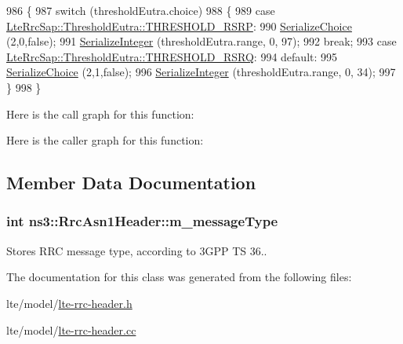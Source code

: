 \begin{DoxyCode}
986 \{
987   \textcolor{keywordflow}{switch} (thresholdEutra.choice)
988     \{
989     \textcolor{keywordflow}{case} \hyperlink{structns3_1_1LteRrcSap_1_1ThresholdEutra_ad3ed2704b836132980dd2e97cb03822ca0663d5baa9382bd755acb712f6ebf707}{LteRrcSap::ThresholdEutra::THRESHOLD\_RSRP}:
990       \hyperlink{classns3_1_1Asn1Header_a400ef4a710499da80fc55e23a973d4fa}{SerializeChoice} (2,0,\textcolor{keyword}{false});
991       \hyperlink{classns3_1_1Asn1Header_ab1c3bd37730affa7473bc759d625c29a}{SerializeInteger} (thresholdEutra.range, 0, 97);
992       \textcolor{keywordflow}{break};
993     \textcolor{keywordflow}{case} \hyperlink{structns3_1_1LteRrcSap_1_1ThresholdEutra_ad3ed2704b836132980dd2e97cb03822ca6e8bda2b99825f09f53388c29b6402b4}{LteRrcSap::ThresholdEutra::THRESHOLD\_RSRQ}:
994     \textcolor{keywordflow}{default}:
995       \hyperlink{classns3_1_1Asn1Header_a400ef4a710499da80fc55e23a973d4fa}{SerializeChoice} (2,1,\textcolor{keyword}{false});
996       \hyperlink{classns3_1_1Asn1Header_ab1c3bd37730affa7473bc759d625c29a}{SerializeInteger} (thresholdEutra.range, 0, 34);
997     \}
998 \}
\end{DoxyCode}


Here is the call graph for this function\+:




Here is the caller graph for this function\+:




\subsection{Member Data Documentation}
\subsubsection[{\texorpdfstring{m\+\_\+message\+Type}{m_messageType}}]{\setlength{\rightskip}{0pt plus 5cm}int ns3\+::\+Rrc\+Asn1\+Header\+::m\+\_\+message\+Type\hspace{0.3cm}{\ttfamily [protected]}}\hypertarget{classns3_1_1RrcAsn1Header_ac4f5302ccdfed580e79d62f6be6a4bee}{}\label{classns3_1_1RrcAsn1Header_ac4f5302ccdfed580e79d62f6be6a4bee}


Stores R\+RC message type, according to 3\+G\+PP TS 36.. 



The documentation for this class was generated from the following files\+:\begin{DoxyCompactItemize}
\item 
lte/model/\hyperlink{lte-rrc-header_8h}{lte-\/rrc-\/header.\+h}\item 
lte/model/\hyperlink{lte-rrc-header_8cc}{lte-\/rrc-\/header.\+cc}\end{DoxyCompactItemize}
